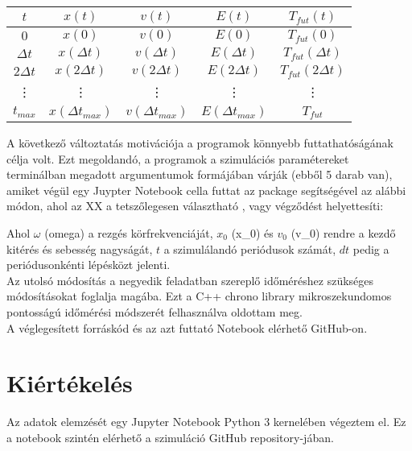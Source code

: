 \begin{multicols}{2}
\begin{center}
\begin{tabular}{c|c|c|c|c}
$t$ & $x \left( t \right)$ & $v \left( t \right)$ & $E \left( t \right)$ & $T_{fut} \left( t \right)$ \\
\hline \hline
$0$ & $x \left( 0 \right)$ & $v \left( 0 \right)$  & $E \left( 0 \right)$ & $T_{fut} \left( 0 \right)$ \\
\hline
$\Delta t$ & $x \left( \Delta t \right)$ & $v \left( \Delta t \right)$ & $E \left( \Delta t \right)$ & $T_{fut} \left( \Delta t \right)$ \\
\hline
$2 \Delta t$ & $x \left( 2 \Delta t \right)$ & $v \left( 2 \Delta t \right)$ & $E \left( 2 \Delta t \right)$ & $T_{fut} \left( 2 \Delta t \right)$ \\
\hline
\vdots & \vdots & \vdots & \vdots & \vdots \\
\hline
$t_{max}$ & $x \left( \Delta t_{max} \right)$ & $v \left( \Delta t_{max} \right)$ & $E \left( \Delta t_{max} \right)$ &$T_{fut}$ \\
\hline
\end{tabular}
\end{center}
\label{tab1}
\hfill \break \hfill \break
\noindent A következő változtatás motivációja a programok könnyebb futtathatóságának célja volt. Ezt megoldandó, a programok a szimulációs paramétereket terminálban megadott argumentumok formájában várják (ebből 5 darab van), amiket végül egy Juypter Notebook cella futtat az  package segítségével az alábbi módon, ahol az XX a tetszőlegesen választható , vagy  végződést helyettesíti:
\begin{center}
\end{center}
Ahol $\omega$ (omega) a rezgés körfrekvenciáját, $x_{0}$ (x\_0) és $v_{0}$ (v\_0) rendre a kezdő kitérés és sebesség nagyságát, $t$ a szimulálandó periódusok számát, $dt$ pedig a periódusonkénti lépésközt jelenti. \\
Az utolsó módosítás a negyedik feladatban szereplő időméréshez szükséges módosításokat foglalja magába. Ezt a C++ chrono library mikroszekundomos pontosságú időmérési módszerét felhasználva oldottam meg. \\
A véglegesített forráskód és az azt futtató Notebook elérhető GitHub-on\cite{github}.

\section{Kiértékelés}
Az adatok elemzését egy Jupyter Notebook Python 3 kernelében végeztem el. Ez a notebook szintén elérhető a szimuláció GitHub repository-jában\cite{github}.


\end{multicols}
